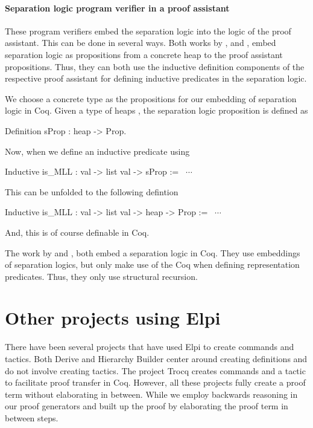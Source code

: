 \documentclass[thesis.tex]{subfiles}
\begin{document}
\paragraph{Separation logic program verifier in a proof assistant}
These program verifiers embed the separation logic into the logic of the proof assistant. This can be done in several ways. Both works by  \cite{appelTacticsSeparationLogic2006}, and  \cite{rouvoetIntrinsicallyTypedCompilation2021}, embed separation logic as propositions from a concrete heap to the proof assistant propositions. Thus, they can both use the inductive definition components of the respective proof assistant for defining inductive predicates in the separation logic.
\begin{example}{}{}
  We choose a concrete type as the propositions for our embedding of separation logic in Coq. Given a type of heaps , the separation logic proposition is defined as
  \begin{coqcode}
    Definition sProp : heap -> Prop.
  \end{coqcode}
  Now, when we define an inductive predicate using 
  \begin{coqcode}
    Inductive is_MLL : val -> list val -> sProp := ~$\cdots$~
  \end{coqcode}
  This can be unfolded to the following defintion
  \begin{coqcode}
    Inductive is_MLL : val -> list val -> heap -> Prop := ~$\cdots$~
  \end{coqcode}
  And, this is of course definable in Coq.
\end{example}

The work by  \cite{chlipalaMostlyautomatedVerificationLowlevel2011} and  \cite{bengtsonCharge2012}, both embed a separation logic in Coq. They use embeddings of separation logics, but only make use of the Coq  when defining representation predicates. Thus, they only use structural recursion.

\section{Other projects using Elpi}\label{sec:OtherElpiProj}
There have been several projects that have used Elpi to create commands and tactics. Both Derive \cite{tassiDerivingProvedEquality2019} and Hierarchy Builder \cite{cohenHierarchyBuilderAlgebraic2020} center around creating definitions and do not involve creating tactics. The project Trocq \cite{cohenTrocqProofTransfer2024} creates commands and a tactic to facilitate proof transfer in Coq. However, all these projects fully create a proof term without elaborating in between. While we employ backwards reasoning in our proof generators and built up the proof by elaborating the proof term in between steps.
\end{document}
